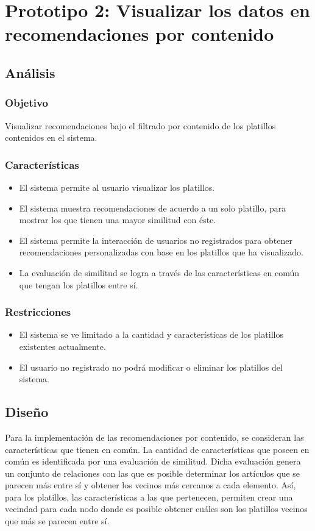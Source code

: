 \chapter{Prototipo 2: Visualizar los datos en recomendaciones por contenido}
  \section{Análisis}
    \subsection{Objetivo}
      Visualizar recomendaciones bajo el filtrado por contenido de los platillos contenidos en el sistema. 

    \subsection{Características}
    \begin{itemize}
      \item El sistema permite al usuario visualizar los platillos.
      \item El sistema muestra recomendaciones de acuerdo a un solo platillo, para mostrar los que tienen una mayor similitud con éste.
      \item El sistema permite la interacción de usuarios no registrados para obtener recomendaciones personalizadas con base en los platillos que ha visualizado.
      \item La evaluación de similitud se logra a través de las características en común que tengan los platillos entre sí.
    \end{itemize}

    \subsection{Restricciones}
    \begin{itemize}
      \item El sistema se ve limitado a la cantidad y características de los platillos existentes actualmente.
      \item El usuario no registrado no podrá modificar o eliminar los platillos del sistema.
    \end{itemize}

  \section{Diseño}
    Para la implementación de las recomendaciones por contenido, se consideran las características que tienen en común. La cantidad de características que poseen en común es identificada por una evaluación de similitud. Dicha evaluación genera un conjunto de relaciones con las que es posible determinar los artículos que se parecen más entre sí y obtener los vecinos más cercanos a cada elemento. Así, para los platillos, las características a las que pertenecen, permiten crear una vecindad para cada nodo donde es posible obtener cuáles son los platillos vecinos que más se parecen entre sí.

